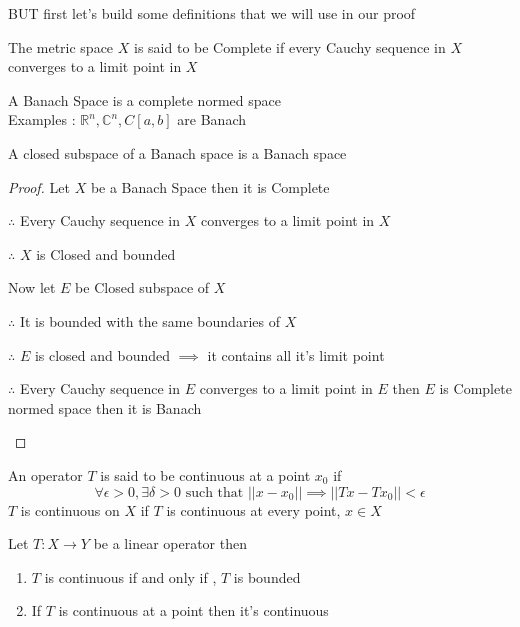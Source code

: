 BUT first let's build some definitions that we will use in our proof 
\vmasafa
\begin{definition}
    The metric space $X$ is said to be Complete if every Cauchy sequence in $X$ 
    converges to a limit point in $X$
\end{definition}
\vmasafa
\begin{definition}
    A Banach Space is a complete normed space 
    \\
    Examples : $\mathbb{R}^n , \mathbb{C}^n , C[a,b]$ are Banach
\end{definition}

\begin{lemma}
    A closed subspace of a Banach space is a Banach space
\end{lemma}
\begin{proof}[Proof]
    Let $X$ be a Banach Space then it is Complete 
    
    \begin{adjustwidth}{1cm}{2cm}
        $\therefore$ Every Cauchy sequence in $X$ converges to a limit point in $X$ 
    
        $\therefore$ $X$ is Closed and bounded
    
        Now let $E$ be Closed subspace of $X$ 
    
        $\therefore$ It is bounded with the same boundaries of $X$
    
        $\therefore$ $E$ is closed and bounded $\implies$ it contains all it's limit point 
    
        $\therefore$ Every Cauchy sequence in $E$ converges to a limit point in $E$ then $E$ is Complete normed space then it is Banach
    \end{adjustwidth}
\end{proof}
\vmasafa
\begin{definition}
    An operator $T$ is said to be continuous at a point $x_0$ if 
    \[
        \forall \epsilon>0 , \exists \delta>0 \text{ such that } ||x-x_0|| \implies ||Tx-Tx_0|| < \epsilon
    \]
    $T$ is continuous on $X$ if $T$ is continuous at every point, $x \in X$

    Let $T : X \to Y$ be a linear operator then 
    \begin{enumerate}
        \item $T$ is continuous if and only if , $T$ is bounded
        \item If $T$ is continuous at a point then it's continuous
    \end{enumerate}
\end{definition}

